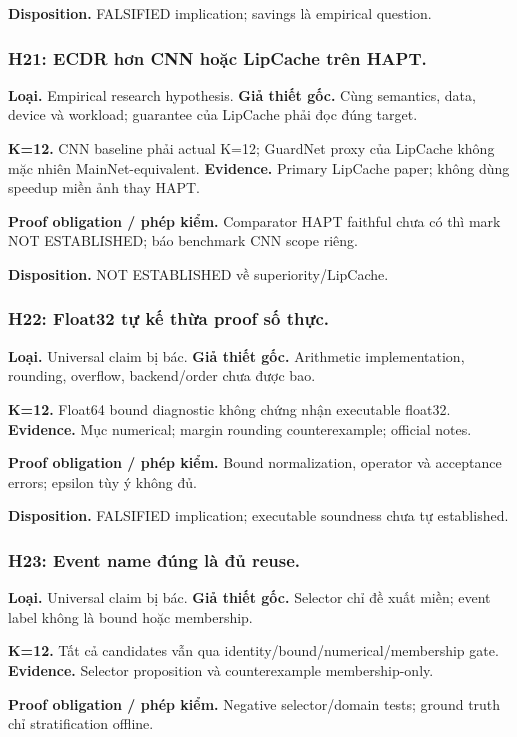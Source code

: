 \documentclass[11pt,a4paper]{article}
\theoremstyle{remark}
\begin{document}
\textbf{Disposition.} FALSIFIED implication; savings là empirical question.

\subsubsection*{H21: ECDR hơn CNN hoặc LipCache trên HAPT.}
\textbf{Loại.} Empirical research hypothesis. \textbf{Giả thiết gốc.} Cùng semantics, data, device và workload; guarantee của LipCache phải đọc đúng target.

\textbf{K=12.} CNN baseline phải actual K=12; GuardNet proxy của LipCache không mặc nhiên MainNet-equivalent. \textbf{Evidence.} Primary LipCache paper\cite{lipcache}; không dùng speedup miền ảnh thay HAPT.

\textbf{Proof obligation / phép kiểm.} Comparator HAPT faithful chưa có thì mark NOT ESTABLISHED; báo benchmark CNN scope riêng.

\textbf{Disposition.} NOT ESTABLISHED về superiority/LipCache.

\subsubsection*{H22: Float32 tự kế thừa proof số thực.}
\textbf{Loại.} Universal claim bị bác. \textbf{Giả thiết gốc.} Arithmetic implementation, rounding, overflow, backend/order chưa được bao.

\textbf{K=12.} Float64 bound diagnostic không chứng nhận executable float32. \textbf{Evidence.} Mục numerical; margin rounding counterexample; official notes\cite{pytorch-numerical}.

\textbf{Proof obligation / phép kiểm.} Bound normalization, operator và acceptance errors; epsilon tùy ý không đủ.

\textbf{Disposition.} FALSIFIED implication; executable soundness chưa tự established.

\subsubsection*{H23: Event name đúng là đủ reuse.}
\textbf{Loại.} Universal claim bị bác. \textbf{Giả thiết gốc.} Selector chỉ đề xuất miền; event label không là bound hoặc membership.

\textbf{K=12.} Tất cả candidates vẫn qua identity/bound/numerical/membership gate. \textbf{Evidence.} Selector proposition và counterexample membership-only.

\textbf{Proof obligation / phép kiểm.} Negative selector/domain tests; ground truth chỉ stratification offline.
\end{document}
